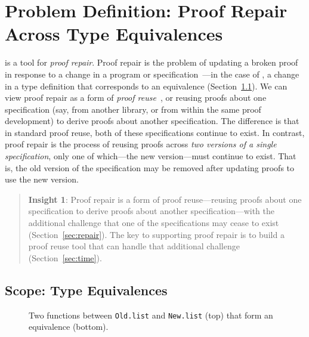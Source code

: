\section{Problem Definition: Proof Repair Across Type Equivalences}
\label{sec:key1}

\toolname is a tool for \textit{proof repair}.
Proof repair is the problem of updating a broken proof in response to a change in a program or specification~\cite{PGL-045, pumpkinpatch}---in the
case of \toolname, a change in a type definition that corresponds to an equivalence (Section~\ref{sec:scope}).
We can view proof repair as a form of 
\textit{proof reuse}~\cite{Ringer2019, felty1994generalization, caplan1995logical, pons2000generalization, johnsen2004theorem}, %
or reusing proofs about one specification (say, from another library, or from within the same proof development)
to derive proofs about another specification.
The difference is that in standard proof reuse, both of these specifications continue to exist.
In contrast, proof repair is the process of reusing proofs across \textit{two versions of a single specification},
only one of which---the new version---must continue to exist.
That is, the old version of the specification may be removed after updating proofs to use the new version.

\begin{quote}
\textbf{Insight 1}:
Proof repair is a form of proof reuse---reusing proofs about one specification to derive proofs about another specification---with 
the additional challenge that one of the specifications may cease to exist (Section~\ref{sec:repair}).
The key to supporting proof repair is to build a proof reuse
tool that can handle that additional challenge (Section~\ref{sec:time}).
\end{quote}

\subsection{Scope: Type Equivalences}
\label{sec:scope}

\begin{figure}
\vspace{-0.3cm}
\caption{Two functions between \lstinline{Old.list} and \lstinline{New.list} (top) that form an equivalence (bottom).}
\label{fig:equivalence}
\end{figure}

